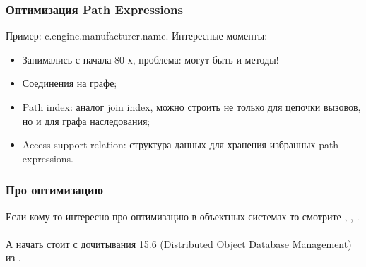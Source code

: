 \documentclass{beamer}
\begin{document}
\begin{frame}
\frametitle{Оптимизация Path Expressions}

Пример: c.engine.manufacturer.name. Интересные моменты:

\begin{itemize}
 \setlength\itemsep{1em}
  \item Занимались с начала 80-х, проблема: могут быть и методы!
  \item Соединения на графе;
  \item Path index: аналог join index, можно строить не только для цепочки вызовов, но и для графа наследования;
  \item Access support relation: структура данных для хранения избранных path expressions.
\end{itemize}
\end{frame}

\begin{frame}
\frametitle{Про оптимизацию}

Если кому-то интересно про оптимизацию в объектных системах то смотрите \cite{Mitchel1993}, \cite{Ozsu0}, \cite{Straube1987}. 
\\~\\
А начать стоит с дочитывания 15.6 (Distributed Object Database Management) из \cite{Ozsu2011}.

\end{frame}

\end{document}
